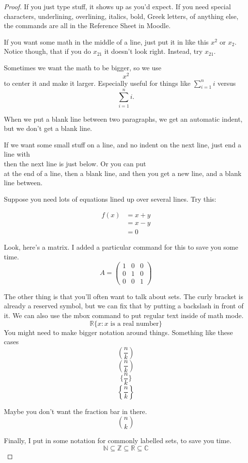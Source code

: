 \documentclass[12 pt]{article}
\theoremstyle{definition}
\newcommand{\C}{\mathbb{C}}
\newcommand{\R}{\mathbb{R}}
\newcommand{\N}{\mathbb{N}}
\newcommand{\Z}{\mathbb{Z}}
\newcommand\m[1]{\begin{pmatrix}#1\end{pmatrix}}
\begin{document}
\begin{proof}
If you just type stuff, it shows up as you'd expect. If you need special characters, underlining, overlining, italics, bold, Greek letters, of anything else, the commands are all in the Reference Sheet in Moodle.

If you want some math in the middle of a line, just put it in like this $x^2$ or $x_2$. Notice though, that if you do $x_21$ it doesn't look right. Instead, try $x_{21}$.

Sometimes we want the math to be bigger, so we use $$x^2$$ to center it and make it larger. Especially useful for things like $\sum_{i=1}^n i$ versus $$\sum_{i=1}^n i.$$

When we put a blank line between two paragraphs, we get an automatic indent, but we don't get a blank line.

If we want some small stuff on a line, and no indent on the next line, just end a line with \\
then the next line is just below. Or you can put \\

at the end of a line, then a blank line, and then you get a new line, and a blank line between.

Suppose you need lots of equations lined up over several lines. Try this:

\begin{align*}
f(x) &= x+y\\
&= x-y\\
&=0
\end{align*}


Look, here's a matrix. I added a particular command for this to save you some time.
$$A = \m{1&0&0\\0&1&0\\0&0&1}$$




The other thing is that you'll often want to talk about sets. The curly bracket is already a reserved symbol, but we can fix that by putting a backslash in front of it. We can also use the mbox command to put regular text inside of math mode.
$$\R \{x:x \mbox{ is a real number}\}$$
You might need to make bigger notation around things. Something like these cases
$$(\frac{n}{k})$$ $$\left(\frac{n}{k}\right)$$
$$\{\frac{n}{k}\}$$ $$\left\{\frac{n}{k}\right\}$$

Maybe you don't want the fraction bar in there. 
$${n \choose k}$$

Finally, I put in some notation for commonly labelled sets, to save you time.
$$\N \subseteq \Z \subseteq \R \subseteq \C$$

\end{proof}

 
\end{document}
